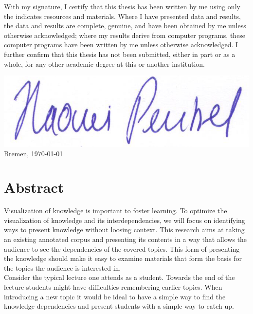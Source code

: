 \documentclass[twoside]{article}
\begin{document}
\newpage
\noindent
  With my signature, I certify that this thesis has been written by me
  using only the indicates resources and materials. Where I have
  presented data and results, the data and results are complete,
  genuine, and have been obtained by me unless otherwise acknowledged;
  where my results derive from computer programs, these computer
  programs have been written by me unless otherwise acknowledged. I
  further confirm that this thesis has not been submitted, either in
  part or as a whole, for any other academic degree at this or another
  institution.

  \vspace{20mm}

    \includegraphics[scale=0.2]{Signature}
 \hfill Bremen, \today
  
\newpage

\thispagestyle{fancy} %


 \section*{Abstract}
Visualization of knowledge is important to foster learning. To optimize the visualization of knowledge and its interdependencies, we will focus on identifying ways to present knowledge without loosing context. This research aims at taking an existing annotated corpus and presenting its contents in a way that allows the audience to see the dependencies of the covered topics. This form of presenting the knowledge should make it easy to examine materials that form the basis for the topics the audience is interested in.\\

Consider the typical lecture one attends as a student. Towards the end of the lecture students might have difficulties remembering earlier topics. When introducing a new topic it would be ideal to have a simple way to find the knowledge dependencies and present students with a simple way to catch up.\\
\end{document}
